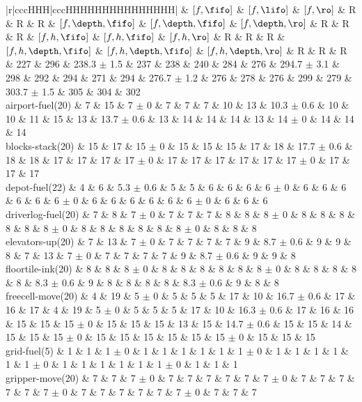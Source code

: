 \begin{center}
\begin{tabular}{|r|cccHHH|cccHHHHHHHHHHHHHHH|}
 & $[f,\fifo]$ & $[f,\lifo]$ & $[f,\ro]$ & R & R & R & $[f,\depth,\fifo]$ & $[f,\depth,\fifo]$ & $[f,\depth,\ro]$ & R & R & R & $[f,h,\fifo]$ & $[f,h,\fifo]$ & $[f,h,\ro]$ & R & R & R & $[f,h,\depth,\fifo]$ & $[f,h,\depth,\fifo]$ & $[f,h,\depth,\ro]$ & R & R & R\\
\hline
 & 227 & 296 & 238.3 $\pm$ 1.5 & 237 & 238 & 240 & 284 & 276 & 294.7 $\pm$ 3.1 & 298 & 292 & 294 & 271 & 294 & 276.7 $\pm$ 1.2 & 276 & 278 & 276 & 299 & 279 & 303.7 $\pm$ 1.5 & 305 & 304 & 302\\
\hline
airport-fuel(20) & 7 & 15 & 7 $\pm$ 0 & 7 & 7 & 7 & 10 & 13 & 10.3 $\pm$ 0.6 & 10 & 10 & 11 & 15 & 13 & 13.7 $\pm$ 0.6 & 13 & 14 & 14 & 14 & 13 & 14 $\pm$ 0 & 14 & 14 & 14\\
blocks-stack(20) & 15 & 17 & 15 $\pm$ 0 & 15 & 15 & 15 & 17 & 18 & 17.7 $\pm$ 0.6 & 18 & 18 & 17 & 17 & 17 & 17 $\pm$ 0 & 17 & 17 & 17 & 17 & 17 & 17 $\pm$ 0 & 17 & 17 & 17\\
depot-fuel(22) & 4 & 6 & 5.3 $\pm$ 0.6 & 5 & 5 & 6 & 6 & 6 & 6 $\pm$ 0 & 6 & 6 & 6 & 6 & 6 & 6 $\pm$ 0 & 6 & 6 & 6 & 6 & 6 & 6 $\pm$ 0 & 6 & 6 & 6\\
driverlog-fuel(20) & 7 & 8 & 7 $\pm$ 0 & 7 & 7 & 7 & 8 & 8 & 8 $\pm$ 0 & 8 & 8 & 8 & 8 & 8 & 8 $\pm$ 0 & 8 & 8 & 8 & 8 & 8 & 8 $\pm$ 0 & 8 & 8 & 8\\
elevators-up(20) & 7 & 13 & 7 $\pm$ 0 & 7 & 7 & 7 & 7 & 9 & 8.7 $\pm$ 0.6 & 9 & 9 & 8 & 7 & 13 & 7 $\pm$ 0 & 7 & 7 & 7 & 7 & 9 & 8.7 $\pm$ 0.6 & 9 & 9 & 8\\
floortile-ink(20) & 8 & 8 & 8 $\pm$ 0 & 8 & 8 & 8 & 8 & 8 & 8 $\pm$ 0 & 8 & 8 & 8 & 8 & 8 & 8.3 $\pm$ 0.6 & 9 & 8 & 8 & 8 & 8 & 8.3 $\pm$ 0.6 & 9 & 8 & 8\\
freecell-move(20) & 4 & 19 & 5 $\pm$ 0 & 5 & 5 & 5 & 17 & 10 & 16.7 $\pm$ 0.6 & 17 & 16 & 17 & 4 & 19 & 5 $\pm$ 0 & 5 & 5 & 5 & 17 & 10 & 16.3 $\pm$ 0.6 & 17 & 16 & 16\\
 & 15 & 15 & 15 $\pm$ 0 & 15 & 15 & 15 & 13 & 15 & 14.7 $\pm$ 0.6 & 15 & 15 & 14 & 15 & 15 & 15 $\pm$ 0 & 15 & 15 & 15 & 15 & 15 & 15 $\pm$ 0 & 15 & 15 & 15\\
grid-fuel(5) & 1 & 1 & 1 $\pm$ 0 & 1 & 1 & 1 & 1 & 1 & 1 $\pm$ 0 & 1 & 1 & 1 & 1 & 1 & 1 $\pm$ 0 & 1 & 1 & 1 & 1 & 1 & 1 $\pm$ 0 & 1 & 1 & 1\\
gripper-move(20) & 7 & 7 & 7 $\pm$ 0 & 7 & 7 & 7 & 7 & 7 & 7 $\pm$ 0 & 7 & 7 & 7 & 7 & 7 & 7 $\pm$ 0 & 7 & 7 & 7 & 7 & 7 & 7 $\pm$ 0 & 7 & 7 & 7\\

\end{tabular}
\end{center}
